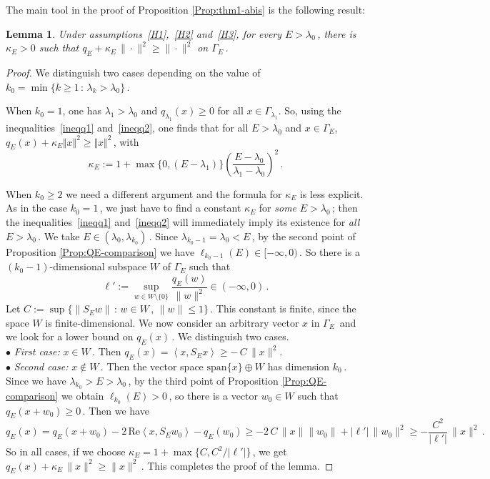 \documentclass[12pt,reqno]{amsart}
\newtheorem{lemma}[theorem]{Lemma}
\newcommand{\innerproduct}[2]{\left\langle #1, #2 \right\rangle}
\renewcommand{\(}{\left(}
\renewcommand{\)}{\right)}
\renewcommand{\Re}{\mathrm{Re}}
\begin{document}
\noindent The main tool in the proof of Proposition \ref{Prop:thm1-abis} is the following result:
\begin{lemma}\label{bounded below}
Under assumptions~\eqref{H1},~\eqref{H2} and~\eqref{H3}, for every $E>\lambda_0\,$, there is $\kappa_E>0$ such that $q_E+\kappa_E\,\|\cdot\|^2 \ge \|\cdot\|^2$ on $\Gamma_E\,$.
\end{lemma}
\begin{proof}
We distinguish two cases depending on the value of $k_0=\min\{k\geq 1\,:\,\lambda_{k}>\lambda_0\}\,$.

When $k_0=1$, one has $\lambda_1>\lambda_0$ and $q_{\lambda_1}(x)\geq 0$ for all $x\in \Gamma_{\lambda_1}$. So, using the inequalities~\eqref{ineqq1} and~\eqref{ineqq2}, one finds that 
for all $E>\lambda_0$ and $x\in\Gamma_E$,
$q_E(x)+\kappa_E\Vert x\Vert^2\geq \Vert x\Vert^2\,$,
with
\[
\kappa_E:=1+\max\big\{0, (E-\lambda_1)\big\}\left(\frac{E-\lambda_0}{\lambda_1-\lambda_0}\right)^2\,.
\]

When $k_0\geq 2$ we need a different argument and the formula for $\kappa_E$ is less explicit. As in the case $k_0=1\,$, we just have to find a constant $\kappa_E$ for {\it some} $E>\lambda_0\,$; then the inequalities~\eqref{ineqq1} and~\eqref{ineqq2} will immediately imply its existence for {\it all} $E>\lambda_0\,$. We take $E\in (\lambda_0,\lambda_{k_0})\,$. Since $\lambda_{k_0-1}=\lambda_0<E\,$, by the second point of Proposition \ref{Prop:QE-comparison} we have $\ell_{k_0-1}(E)\in [-\infty,0)\,$. So there is a $(k_0-1)$-dimensional subspace $W$ of $\Gamma_E$ such that
$$\ell':=\sup_{w\in W\setminus \{0\}} \frac{q_E(w)}{\|w\|^2} \in (-\infty,0)\,.$$
Let $C:=\sup\big\{\| S_E w\|\,:\,w\in W\,,\,\| w \| \le 1\big\}\,$. This constant is finite, since the space $W$ is finite-dimensional. We now consider an arbitrary vector $x$ in $\Gamma_E\,$ and we look for a lower bound on $q_E(x)\,$. We distinguish two cases.
\\[4pt]
\noindent$\bullet$ {\it First case:} $x\in W\,$. Then $q_E(x)=\innerproduct{x}{S_E x}\ge -\,C\, \|x\|^2$.
\\[4pt]
\noindent$\bullet$ {\it Second case:} $x\notin W\,$. Then the vector space $\mathrm{span}\{x\}\oplus W$ has dimension $k_0\,$. Since we have $\lambda_{k_0}>E>\lambda_0\,$, by the third point of Proposition \ref{Prop:QE-comparison} we obtain $\ell_{k_0}(E)>0\,$, so there is a vector $w_0\in W$ such that $q_E(x+w_0)\ge 0\,$. Then we have
\[
q_E(x)=q_E(x+w_0)-2\,\Re \innerproduct{x}{S_E w_0} -q_E(w_0)\ge-2\,C\,\|x \| \| w_0\| +|\ell'| \,\| w_0\|^2\ge -\frac{C^2}{|\ell'|}\,\|x \|^2\,.
\]
So in all cases, if we choose $\kappa_E=1+\max\big\{C,C^2/|\ell'|\big\}\,$, we get $q_E(x)+\kappa_E\,\|x \|^2\ge \|x \|^2\,$. This completes the proof of the lemma.
\end{proof}
\end{document}

